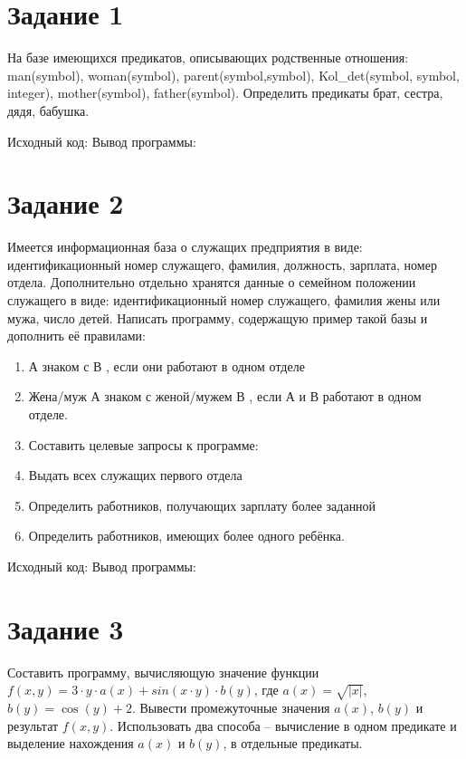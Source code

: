 \documentclass[a4paper,14pt]{article}
\begin{document}
    
    \section*{Задание 1}

    На базе имеющихся предикатов, описывающих родственные отношения: man(symbol), woman(symbol), parent(symbol,symbol), Kol\_det(symbol, symbol, integer), mother(symbol), father(symbol).
    Определить предикаты брат, сестра, дядя, бабушка.

    Исходный код:
    {\small {}}
    Вывод программы:
    {\small {}}


    \section*{Задание 2}

    Имеется информационная база о служащих предприятия в виде:
    идентификационный номер служащего, фамилия, должность, зарплата, номер отдела. Дополнительно отдельно хранятся данные о семейном положении служащего в виде: идентификационный номер служащего, фамилия жены или мужа, число детей.
    Написать программу, содержащую пример такой базы и дополнить её правилами:
    \begin{enumerate}

        \item А знаком с В , если они работают в одном отделе
        \item Жена/муж А знаком с женой/мужем В , если А и В работают в одном отделе.
        \item Составить целевые запросы к программе:
        \item Выдать всех служащих первого отдела
        \item Определить работников, получающих зарплату более заданной
        \item Определить работников, имеющих более одного ребёнка.
    \end{enumerate}


    Исходный код:
    {\small {}}
    Вывод программы:
    {\small {}}


    \section*{Задание 3}

    Составить программу, вычисляющую значение функции
    $f(x,y)=3 \cdot y \cdot a(x) + sin(x \cdot y) \cdot b(y)$, где
    $a(x)=\sqrt{| x|}$,
    $b(y)=\cos(y) +2$.
    Вывести промежуточные значения $a(x)$,  $b(y)$   и результат      $f (x,y)$.
    Использовать два способа -- вычисление в одном предикате и выделение нахождения $a(x)$ и  $b(y)$, в отдельные предикаты.
\end{document}
